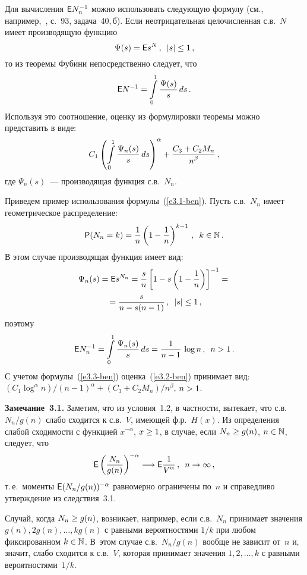 \begin{multicols}{2}
\smallskip

Для вычисления  ${\sf E} N_n^{-1}$ можно использовать следующую формулу
(см., например,~\cite{25-ben},  с.~93, задача~40,\,б). Если
неотрицательная целочисленная с.в.~$N$  имеет производящую функцию
$$
\Psi(s) =  {\sf E} s^{N}\,,   \enskip  |s| \le 1\,,
$$
то из теоремы Фубини непосредственно следует, что
\begin{equation}
{\sf E} N^{-1} = \int\limits_0^1 \displaystyle\frac{\displaystyle \Psi(s)\mathstrut}{\displaystyle s\mathstrut}\, ds\,. \label{e3.1-ben}
\end{equation}
Используя это соотношение, оценку из формулировки теоремы можно
представить  в виде:
\begin{equation}
C_1 \left(\int\limits_0^1 \displaystyle\frac{\displaystyle \Psi_n(s)\mathstrut}{\displaystyle s\mathstrut}\, ds\right)^\alpha  +
\displaystyle\frac{\displaystyle C_3 + C_2 M_n\mathstrut}{\displaystyle n^\beta\mathstrut}\,,\label{e3.2-ben}
\end{equation}
где $\Psi_n(s)$~--- производящая функция с.в.~$N_n$.

Приведем пример использования формулы~(\ref{e3.1-ben}). Пусть с.в.~$N_n$ имеет
геометрическое распределение:
$$
{{\sf P}}(N_n = k) =  \displaystyle\frac{\displaystyle 1\mathstrut}{\displaystyle n\mathstrut} \left(1 - \displaystyle\frac{\displaystyle 1\mathstrut}{\displaystyle n\mathstrut}\right)^{k-1}\,,\enskip
 k\in\mathbb N\,.
$$
В этом случае производящая функция имеет вид:
\begin{multline*}
\Psi_n(s) =  {\sf E} s^{N_n} =  \displaystyle\frac{\displaystyle s\mathstrut}{\displaystyle n\mathstrut}\left[1 -  s\left(1 -
\displaystyle\frac{\displaystyle 1\mathstrut}{\displaystyle n\mathstrut}\right)\right]^{-1}={}\\
{}=\displaystyle\frac{\displaystyle s\mathstrut}{\displaystyle n-s(n-1)\mathstrut}\,, \enskip   |s| \le 1\,,
\end{multline*}
поэтому
\begin{equation}
{\sf E} N_n^{-1} = \int\limits_0^1 \displaystyle\frac{\displaystyle \Psi_n(s)\mathstrut}{\displaystyle s\mathstrut}\, ds = \displaystyle\frac{\displaystyle 1\mathstrut}{\displaystyle n -
1\mathstrut} \,\log n\,,  \enskip  n > 1\,. \label{e3.3-ben}
\end{equation}
С учетом формулы~(\ref{e3.3-ben}) оценка~(\ref{e3.2-ben}) принимает вид:
$(C_1 \log^{\alpha} n)/(n - 1)^\alpha  +  (C_3 + C_2
M_n)/n^\beta$, $n \hm> 1$.

\smallskip

\textbf{Замечание~3.1.} Заметим, что из условия~1.2, в частности,
вытекает, что с.в.\ $N_n/g(n)$ слабо сходится к с.в.~$V$,  имеющей
ф.р.~$H(x)$. Из определения слабой сходимости с функцией
$x^{-\alpha}$, $ x \hm\ge 1$, в случае, если $N_n \hm\ge g(n)$, $n\hm\in\N$,
следует, что
$$
{\sf E} \left(\displaystyle\frac{\displaystyle N_n\mathstrut}{\displaystyle g(n)\mathstrut}\right)^{-\alpha} \longrightarrow   {\sf E}
\displaystyle\frac{\displaystyle 1\mathstrut}{\displaystyle V^\alpha\mathstrut}\,,  \enskip  n\to\infty\,,
$$
т.\,е.\  моменты  ${\sf E} (N_n/g(n))^{-\alpha}$ равномерно ограничены по~$n$  
и справедливо утверждение из следствия~3.1.

\smallskip

Случай, когда $N_n\hm\ge g(n)$, возникает, например, если с.в.\ $N_n$
принимает значения $g(n), 2g(n), \ldots , kg(n)$  с равными
вероятностями    $1/k$ при любом фиксированном $k\hm\in\N$. В~этом
случае с.в.\ $N_n/g(n)$  вообще не зависит от~$n$ и, значит, слабо
сходится к с.в.~$V$,  которая принимает значения $1, 2, \ldots , k$ с
равными вероятностями~$1/k$.


\end{multicols}
